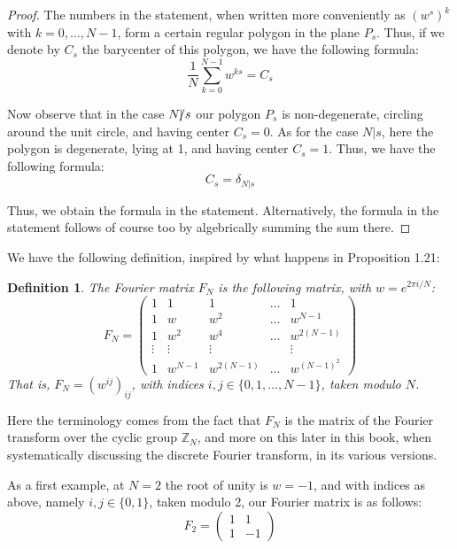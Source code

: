 \documentclass[12pt]{amsbook}
\newtheorem{definition}[theorem]{Definition}
\begin{document}
\begin{proof}
The numbers in the statement, when written more conveniently as $(w^s)^k$ with $k=0,\ldots,N-1$, form a certain regular polygon in the plane $P_s$. Thus, if we denote by $C_s$ the barycenter of this polygon, we have the following formula:
$$\frac{1}{N}\sum_{k=0}^{N-1}w^{ks}=C_s$$

Now observe that in the case $N\slash\hskip-1.6mm|\,s$ our polygon $P_s$ is non-degenerate, circling around the unit circle, and having center $C_s=0$. As for the case $N|s$, here the polygon is degenerate, lying at 1, and having center $C_s=1$. Thus, we have the following formula:
$$C_s=\delta_{N|s}$$

Thus, we obtain the formula in the statement. Alternatively, the formula in the statement follows of course too by algebrically summing the sum there.
\end{proof}

We have the following definition, inspired by what happens in Proposition 1.21:


\begin{definition}
The Fourier matrix $F_N$ is the following matrix, with $w=e^{2\pi i/N}$:
$$F_N=
\begin{pmatrix}
1&1&1&\ldots&1\\
1&w&w^2&\ldots&w^{N-1}\\
1&w^2&w^4&\ldots&w^{2(N-1)}\\
\vdots&\vdots&\vdots&&\vdots\\
1&w^{N-1}&w^{2(N-1)}&\ldots&w^{(N-1)^2}
\end{pmatrix}$$
That is, $F_N=(w^{ij})_{ij}$, with indices $i,j\in\{0,1,\ldots,N-1\}$, taken modulo $N$.
\end{definition}

Here the terminology comes from the fact that $F_N$ is the matrix of the Fourier transform over the cyclic group $\mathbb Z_N$, and more on this later in this book, when systematically discussing the discrete Fourier transform, in its various versions.

\bigskip

As a first example, at $N=2$ the root of unity is $w=-1$, and with indices as above, namely $i,j\in\{0,1\}$, taken modulo 2, our Fourier matrix is as follows:
$$F_2=\begin{pmatrix}1&1\\1&-1\end{pmatrix}$$
\end{document}
